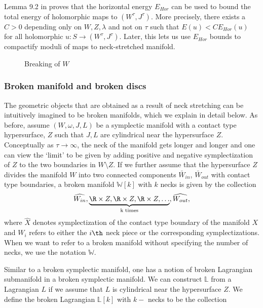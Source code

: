 \begin{remark} \label{rem:horizontalmajorizes}
    Lemma 9.2 in \cite{bhewz} proves that the horizontal energy $E_{Hor}$ can be used to bound the total energy of holomorphic maps to $( W^\tau, J^\tau )$. More precisely, there exists a $C>0$ depending only on $W,Z,\lambda$ and not on $\tau$ such that $E(u) < CE_{Hor}(u)$ for all holomorphic $u : S \to (W^\tau,J^\tau)$. Later, this lets us use $E_{Hor}$ bounds to compactify moduli of maps to neck-stretched manifold.  
\end{remark}

\begin{figure}[ht]
    \centering
    \caption{Breaking of $W$}
    \label{fig:breaking}
\end{figure}

\subsubsection{Broken manifold and broken discs}\label{subsub:brokenstuff}

The geometric objects that are obtained as a result of neck stretching can be intuitively imagined to be broken manifolds, which we explain in detail below. As before, assume $(W,\omega,J,L)$ be a symplectic manifold with a contact type hypersurface, $Z$ such that $J,L$ are cylindrical near the hypersurface $Z$. Conceptually as $\tau \to \infty$, the neck of the manifold gets longer and longer and one can view the `limit' to be given by adding positive and negative symplectization of $Z$ to the two boundaries in $W\setminus Z$. If we further assume that the hypersurface $Z$ divides the manifold $W$ into two connected components $\bar{W}_{in}$, $\bar{W}_{out}$ with contact type boundaries, a  broken manifold $\mathbb{W}[k]$ with $k$ necks is given by the collection  $$\widehat{W_{in}}, \underbrace{ \R\times Z,\R\times Z,\R\times Z,\dots  }_{\text {k times}} , \widehat{W_{out}},$$
where $\widehat{X}$ denotes symplectization of the contact type boundary of the manifold $X$ and $W_i$ refers to either the $i\th$ neck piece or the corresponding symplectizations. When we want to refer to a broken manifold without specifying the number of necks, we use the notation $\mathbb{W}$.

Similar to a broken symplectic manifold, one has a notion of broken Lagrangian submanifold in a broken symplectic manifold. We can construct $\mathbb{L}$ from a Lagrangian $L$ if we  assume that $L$ is cylindrical near the hypersurface $Z$. We define the broken Lagrangian $\mathbb{L}[k]$ with $k-$ necks to be the collection

